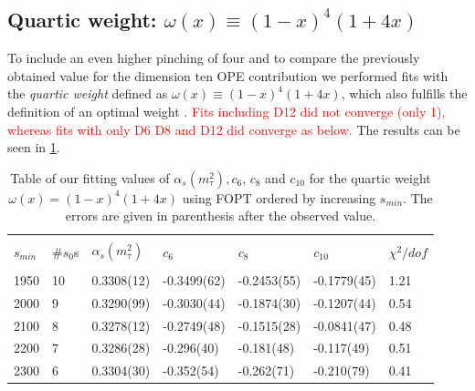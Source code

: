 \documentclass[../../index.tex]{subfiles}
\begin{document}
\subsection{Quartic weight: $\omega(x) \equiv (1-x)^4(1+4x)$}
To include an even higher pinching of four and to compare the previously
obtained value for the dimension ten \textsc{OPE} contribution we performed fits
with the \textit{quartic weight} defined as $\omega(x) \equiv (1-x)^4(1+4x)$,
which also fulfills the definition of an optimal weight \cite{Beneke2012}. 
\textcolor{red}{Fits including D12 did not converge (only 1), whereas fits with
  only D6 D8 and D12 did converge as below.} The results can be seen in
\cref{table:fitWQuarticAlD6D8D10}.
\begin{table}
  \centering
  \begin{tabular}{lllllll}
    \toprule \\
    $s_{min}$ & \#$s_0$s & $\alpha_s(m_\tau^2)$ & $c_6$ & $c_8$ & $c_{10}$ & $\chi^2/dof$  \\
    \hline \\
    1950 & 10 & 0.3308(12) & -0.3499(62) & -0.2453(55) & -0.1779(45) & 1.21 \\
    2000 & 9 & 0.3290(99) & -0.3030(44) & -0.1874(30) & -0.1207(44) & 0.54 \\
    2100 & 8 & 0.3278(12) & -0.2749(48) & -0.1515(28) & -0.0841(47) & 0.48 \\
    2200 & 7 & 0.3286(28) & -0.296(40) & -0.181(48) & -0.117(49) & 0.51 \\
    2300 & 6 & 0.3304(30) & -0.352(54) & -0.262(71) & -0.210(79) & 0.41 \\
    \bottomrule
  \end{tabular}
  \caption{Table of our fitting values of $\alpha_s(m_\tau^2), c_6$, $c_8$ and
    $c_{10}$ for the quartic weight $\omega(x)=(1-x)^4(1+4x)$ using FOPT ordered
    by increasing $s_{min}$. The errors are given in parenthesis after the observed value.}
  \label{table:fitWQuarticAlD6D8D10}
\end{table}
\end{document}
